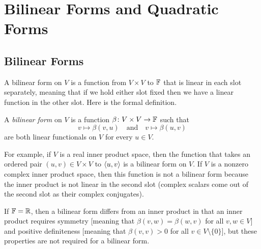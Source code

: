 \section{Bilinear Forms and Quadratic Forms}

\subsection{Bilinear Forms}

A bilinear form on $V$ is a function from $V\times V$ to $\mathbb{F}$ that is linear in
each slot separately, meaning that if we hold either slot fixed then we have a
linear function in the other slot. Here is the formal definition.

\begin{definition}\label{ax:9.1}
A \emph{bilinear form} on $V$ is a function $\beta\colon V\times V\to\mathbb{F}$ such
that
\[ v\mapsto\beta(v,u) \quad\text{and}\quad v\mapsto\beta(u,v) \]
are both linear functionals on $V$ for every $u\in V$.
\end{definition}

%
For example, if $V$ is a real inner product space, then the function that takes
an ordered pair $(u,v)\in V\times V$ to $\langle u, v \rangle$ is a bilinear form on $V$.
If $V$ is a nonzero complex inner product space, then this function is not a
bilinear form because the inner product is not linear in the second slot
(complex scalars come out of the second slot as their complex conjugates).

If $\mathbb{F}=\mathbb{R}$, then a bilinear form differs from an inner product in that an inner
product requires symmetry $\bigl[$meaning that $\beta(v,w)=\beta(w,v)$ for all
$v,w\in V\bigr]$ and positive definiteness $\bigl[$meaning that
$\beta(v,v)>0$ for all $v\in V\setminus\{0\}\bigr]$, but these properties are
not required for a bilinear form.

